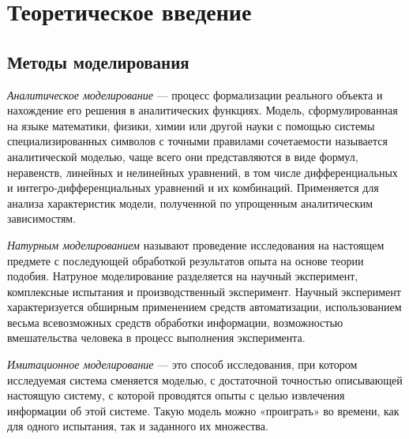 
\chapter{Теоретическое введение}
\label{chap1}

\section{Методы моделирования}
\label{chap1:sec1}


\emph{Аналитическое моделирование} --- процесс формализации реального объекта
и нахождение его решения в аналитических функциях. Модель,
сформулированная на языке математики, физики, химии или другой науки с
помощью системы специализированных символов с точными правилами
сочетаемости называется аналитической моделью, чаще всего они
представляются в виде формул, неравенств, линейных и нелинейных
уравнений, в том числе дифференциальных и интегро-дифференциальных
уравнений и их комбинаций. Применяется для анализа характеристик
модели, полученной по упрощенным аналитическим зависимостям.


\emph{Натурным моделированием} называют проведение исследования на настоящем
предмете с последующей обработкой результатов опыта на основе теории
подобия. Натруное моделирование разделяется на научный эксперимент,
комплексные испытания и производственный эксперимент. Научный
эксперимент характеризуется обширным применением средств
автоматизации, использованием весьма всевозможных средств обработки
информации, возможностью вмешательства человека в процесс выполнения
эксперимента.


\emph{Имитационное моделирование} --- это способ исследования, при котором
исследуемая система сменяется моделью, с достаточной точностью
описывающей настоящую систему, с которой проводятся опыты с целью
извлечения информации об этой системе. Такую модель можно «проиграть»
во времени, как для одного испытания, так и заданного их множества.


